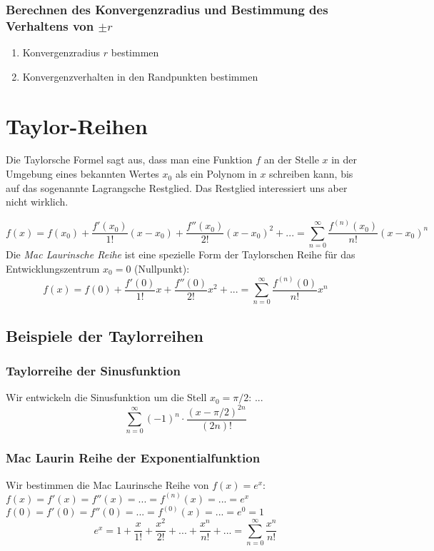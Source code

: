 \subsubsection*{Berechnen des Konvergenzradius und Bestimmung des Verhaltens von $\pm r$}
\begin{enumerate}
	\item Konvergenzradius $r$ bestimmen
	\item Konvergenzverhalten in den Randpunkten bestimmen
\end{enumerate}

\section{Taylor-Reihen}
Die Taylorsche Formel sagt aus, dass man eine Funktion $f$ an der Stelle $x$ in der Umgebung eines bekannten Wertes $x_0$ als ein Polynom in $x$ schreiben kann, bis auf das sogenannte Lagrangsche Restglied. Das Restglied interessiert uns aber nicht wirklich.
\begin{formel}
$$f(x) = f(x_0) + \frac{f'(x_0)}{1!}(x-x_0) + \frac{f''(x_0)}{2!}(x-x_0)^2 + ... = \sum\limits_{n=0}^{\infty} \frac{f^{(n)}(x_0)}{n!}(x - x_0)^n$$
Die \textit{Mac Laurinsche Reihe} ist eine spezielle Form der Taylorschen Reihe für das Entwicklungszentrum $x_0 = 0$ (Nullpunkt):
$$f(x) = f(0) + \frac{f'(0)}{1!}x + \frac{f''(0)}{2!}x^2 + ... = \sum\limits_{n=0}^{\infty} \frac{f^{(n)}(0)}{n!}x^n$$
\end{formel}

\subsection{Beispiele der Taylorreihen}
\subsubsection*{Taylorreihe der Sinusfunktion}
Wir entwickeln die Sinusfunktion um die Stell $x_0 = \pi / 2$:
...
$$ \sum\limits_{n=0}^{\infty} (-1)^n \cdot \frac{(x-\pi / 2)^{2n}}{(2n)!}$$

\subsubsection*{Mac Laurin Reihe der Exponentialfunktion}
Wir bestimmen die Mac Laurinsche Reihe von $f(x) = e^x$:\\
$f(x) = f'(x) = f''(x) = ... = f^{(n)}(x) = ... = e^x$\\
$f(0) = f'(0) = f''(0) = ... = f^{(0)}(x) = ... = e^0 = 1$
$$e^x = 1 + \frac{x}{1!} + \frac{x^2}{2!} + ... + \frac{x^n}{n!} + ... = \sum\limits_{n=0}^{\infty} \frac{x^n}{n!}$$

